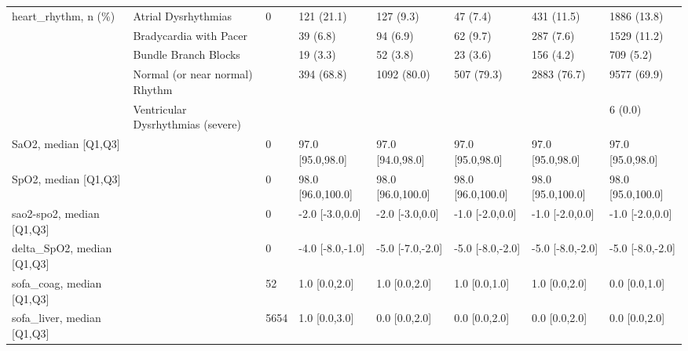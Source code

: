\begin{tabular}{llllllll}
heart\_rhythm, n (\%) & Atrial Dysrhythmias &               0 &                121 (21.1) &                 127 (9.3) &                 47 (7.4) &                431 (11.5) &              1886 (13.8) \\
                        & Bradycardia with Pacer &                 &                  39 (6.8) &                  94 (6.9) &                 62 (9.7) &                 287 (7.6) &              1529 (11.2) \\
                        & Bundle Branch Blocks &                 &                  19 (3.3) &                  52 (3.8) &                 23 (3.6) &                 156 (4.2) &                709 (5.2) \\
                        & Normal (or near normal) Rhythm &                 &                394 (68.8) &               1092 (80.0) &               507 (79.3) &               2883 (76.7) &              9577 (69.9) \\
                        & Ventricular Dysrhythmias (severe) &                 &                           &                           &                          &                           &                  6 (0.0) \\
SaO2, median [Q1,Q3] &                                   &               0 &          97.0 [95.0,98.0] &          97.0 [94.0,98.0] &         97.0 [95.0,98.0] &          97.0 [95.0,98.0] &         97.0 [95.0,98.0] \\
SpO2, median [Q1,Q3] &                                   &               0 &         98.0 [96.0,100.0] &         98.0 [96.0,100.0] &        98.0 [96.0,100.0] &         98.0 [95.0,100.0] &        98.0 [95.0,100.0] \\
sao2-spo2, median [Q1,Q3] &                                   &               0 &           -2.0 [-3.0,0.0] &           -2.0 [-3.0,0.0] &          -1.0 [-2.0,0.0] &           -1.0 [-2.0,0.0] &          -1.0 [-2.0,0.0] \\
delta\_SpO2, median [Q1,Q3] &                                   &               0 &          -4.0 [-8.0,-1.0] &          -5.0 [-7.0,-2.0] &         -5.0 [-8.0,-2.0] &          -5.0 [-8.0,-2.0] &         -5.0 [-8.0,-2.0] \\
sofa\_coag, median [Q1,Q3] &                                   &              52 &             1.0 [0.0,2.0] &             1.0 [0.0,2.0] &            1.0 [0.0,1.0] &             1.0 [0.0,2.0] &            0.0 [0.0,1.0] \\
sofa\_liver, median [Q1,Q3] &                                   &            5654 &             1.0 [0.0,3.0] &             0.0 [0.0,2.0] &            0.0 [0.0,2.0] &             0.0 [0.0,2.0] &            0.0 [0.0,2.0] \\

\end{tabular}
